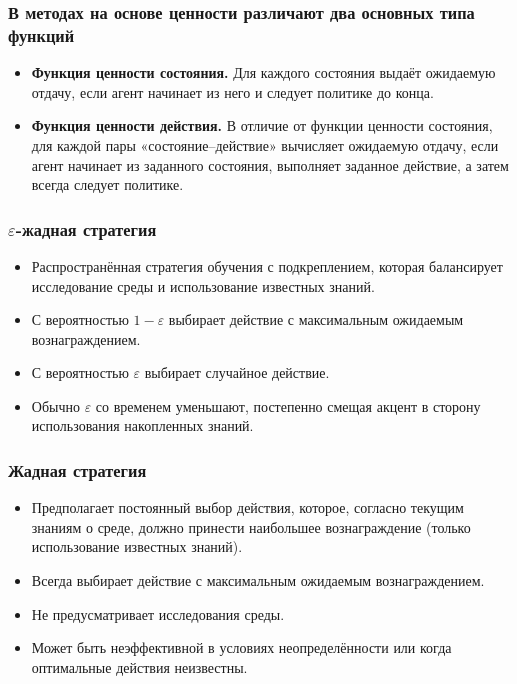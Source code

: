 \documentclass[11pt,a4paper]{article}
\begin{document}
\subsubsection{В методах на основе ценности различают два основных типа функций}\label{among-the-value-based-methods-we-can-find-two-main-strategies}

\begin{itemize}
\tightlist
\item
  \textbf{Функция ценности состояния.} Для каждого состояния выдаёт ожидаемую отдачу, если агент начинает из него и следует политике до конца.
\item
  \textbf{Функция ценности действия.} В отличие от функции ценности состояния, для каждой пары «состояние--действие» вычисляет ожидаемую отдачу, если агент начинает из заданного состояния, выполняет заданное действие, а затем всегда следует политике.
\end{itemize}

\subsubsection{\texorpdfstring{\(\varepsilon\)-жадная стратегия}{epsilon-жадная стратегия}}\label{epsilon-greedy-strategy}

\begin{itemize}
\tightlist
\item
  Распространённая стратегия обучения с подкреплением, которая балансирует исследование среды и использование известных знаний.
\item
  С вероятностью \(1-\varepsilon\) выбирает действие с максимальным ожидаемым вознаграждением.
\item
  С вероятностью \(\varepsilon\) выбирает случайное действие.
\item
  Обычно \(\varepsilon\) со временем уменьшают, постепенно смещая акцент в сторону использования накопленных знаний.
\end{itemize}

\subsubsection{Жадная стратегия}\label{greedy-strategy}

\begin{itemize}
\tightlist
\item
  Предполагает постоянный выбор действия, которое, согласно текущим знаниям о среде, должно принести наибольшее вознаграждение (только использование известных знаний).
\item
  Всегда выбирает действие с максимальным ожидаемым вознаграждением.
\item
  Не предусматривает исследования среды.
\item
  Может быть неэффективной в условиях неопределённости или когда оптимальные действия неизвестны.
\end{itemize}
\end{document}
